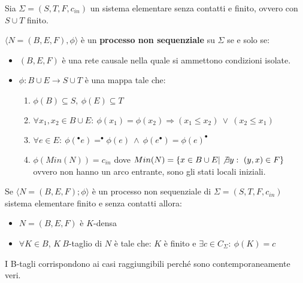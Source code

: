 \begin{definizione}
    Sia $\Sigma = (S, T, F, c_{in})$ un sistema elementare senza contatti e finito,
    ovvero con $S \cup T$ finito.

    $\langle N = (B, E, F), \phi \rangle$ è un \textbf{processo non sequenziale}
    su $\Sigma$ se e solo se:
    \begin{itemize}
        \item $(B, E, F)$ è una rete causale nella quale si ammettono condizioni
              isolate.
        \item $\phi: B \cup E \to S \cup T$ è una mappa tale che:
              \begin{enumerate}
                  \item $\phi(B) \subseteq S, \ \phi(E) \subseteq T$
                  \item $\forall x_1, x_2 \in B \cup E: \ \phi(x_1) = \phi(x_2)
                            \Rightarrow (x_1 \leq x_2) \ \lor \ (x_2 \leq x_1)$
                  \item $\forall e \in E: \ \phi(^{\bullet}e) = ^{\bullet}\phi(e)
                            \ \land \ \phi(e^{\bullet}) = \phi(e)^{\bullet}$
                  \item $\phi(Min(N)) = c_{in}$ dove
                        $Min(N) = \{x \in B \cup E | \not\exists y: \ (y, x) \in F\}$
                        ovvero non hanno un arco entrante, sono gli stati locali
                        iniziali.
              \end{enumerate}
    \end{itemize}
\end{definizione}
Se $\langle N = (B, E, F); \phi \rangle$ è un processo non sequenziale di
$\Sigma = (S, T, F, c_{in})$ sistema elementare finito e senza contatti allora:
\begin{itemize}
    \item $N = (B, E, F)$ è $K$-densa
    \item $\forall K \in B$, $K\ B$-taglio di $N$ è tale che: $K$ è finito e
          $\exists c \in C_{\Sigma}: \ \phi(K) = c$
\end{itemize}
I B-tagli corrispondono ai casi raggiungibili perché sono contemporaneamente veri.

